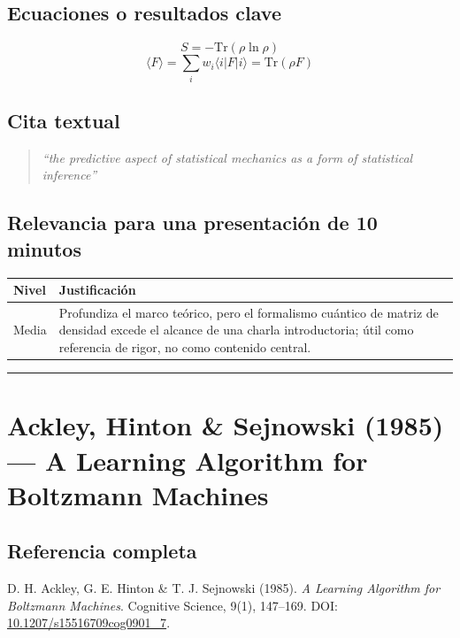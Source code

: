 \documentclass[12pt]{article}
\begin{document}
\subsection*{Ecuaciones o resultados clave}
\begin{equation}
S = -\mathrm{Tr}(\rho \ln \rho)
\end{equation}
\begin{equation}
\langle F \rangle = \sum_i w_i \langle i|F|i\rangle = \mathrm{Tr}(\rho F)
\end{equation}

\subsection*{Cita textual}
\begin{quote}
\textit{``the predictive aspect of statistical mechanics as a form of statistical inference''}
\end{quote}

\subsection*{Relevancia para una presentación de 10 minutos}
\begin{tabular}{@{}p{2cm}p{11.5cm}@{}}
\toprule
\textbf{Nivel} & \textbf{Justificación} \\
\midrule
Media & Profundiza el marco teórico, pero el formalismo cuántico de matriz de densidad excede el alcance de una charla introductoria; útil como referencia de rigor, no como contenido central. \\
\bottomrule
\end{tabular}

\bigskip
\hrule
\bigskip

\section{Ackley, Hinton \& Sejnowski (1985) --- A Learning Algorithm for Boltzmann Machines}

\subsection*{Referencia completa}
D. H. Ackley, G. E. Hinton \& T. J. Sejnowski (1985). \textit{A Learning Algorithm for
Boltzmann Machines}. Cognitive Science, 9(1), 147--169. DOI:
\href{https://doi.org/10.1207/s15516709cog0901_7}{10.1207/s15516709cog0901\_7}. \cite{ackley1985}
\end{document}
